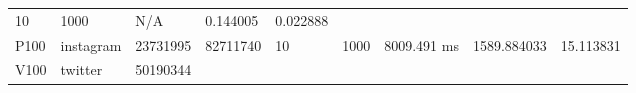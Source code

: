 \documentclass[10pt,oneside]{memoir}
\begin{document}
\begin{longtable}[]{@{}lllllllll@{}}
\begin{minipage}[t]{0.06\columnwidth}
10\strut
\end{minipage} & \begin{minipage}[t]{0.07\columnwidth}\raggedright
1000\strut
\end{minipage} & \begin{minipage}[t]{0.10\columnwidth}\raggedright
N/A\strut
\end{minipage} & \begin{minipage}[t]{0.12\columnwidth}\raggedright
0.144005\strut
\end{minipage} & \begin{minipage}[t]{0.09\columnwidth}\raggedright
0.022888\strut
\end{minipage}\tabularnewline
\begin{minipage}[t]{0.04\columnwidth}\raggedright
P100\strut
\end{minipage} & \begin{minipage}[t]{0.11\columnwidth}\raggedright
instagram\strut
\end{minipage} & \begin{minipage}[t]{0.08\columnwidth}\raggedright
23731995\strut
\end{minipage} & \begin{minipage}[t]{0.09\columnwidth}\raggedright
82711740\strut
\end{minipage} & \begin{minipage}[t]{0.06\columnwidth}\raggedright
10\strut
\end{minipage} & \begin{minipage}[t]{0.07\columnwidth}\raggedright
1000\strut
\end{minipage} & \begin{minipage}[t]{0.10\columnwidth}\raggedright
8009.491 ms\strut
\end{minipage} & \begin{minipage}[t]{0.12\columnwidth}\raggedright
1589.884033\strut
\end{minipage} & \begin{minipage}[t]{0.09\columnwidth}\raggedright
15.113831\strut
\end{minipage}\tabularnewline
\begin{minipage}[t]{0.04\columnwidth}\raggedright
V100\strut
\end{minipage} & \begin{minipage}[t]{0.11\columnwidth}\raggedright
twitter\strut
\end{minipage} & \begin{minipage}[t]{0.08\columnwidth}\raggedright
50190344\strut

\end{minipage}
\end{longtable}
\end{document}

